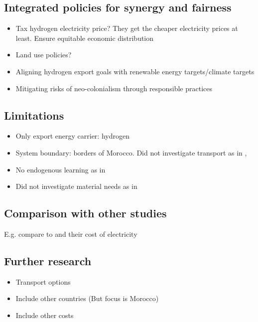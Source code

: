 \subsection{Integrated policies for synergy and fairness}
\begin{itemize}
    \item Tax hydrogen electricity price? They get the cheaper electricity prices at least. Ensure equitable economic distribution
    \item Land use policies?
    \item Aligning hydrogen export goals with renewable energy targets/climate targets 
    \item Mitigating risks of neo-colonialism through responsible practices
\end{itemize}





\subsection{Limitations}
\label{subsec:limitations}
\begin{itemize}
    \item Only export energy carrier: hydrogen
    \item System boundary: borders of Morocco. Did not investigate transport as in \cite{Hampp2021}, \cite{Galimova2023}
    \item No endogenous learning as in \cite{Zeyen2023}
    \item Did not investigate material needs as in \cite{Wang2023}
\end{itemize}

\subsection{Comparison with other studies}
E.g. compare to \cite{Hampp2021} and their cost of electricity

\subsection{Further research}
\begin{itemize}
    \item Transport options
    \item Include other countries (But focus is Morocco)
    \item Include other costs
\end{itemize}